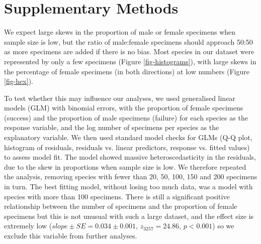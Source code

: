 \documentclass[a4paper, 12pt]{article}
\begin{document}

\newpage
\section*{Supplementary Methods}

We expect large skews in the proportion of male or female specimens when sample size is low, but the ratio of male:female specimens should approach 50:50 as more specimens are added if there is no bias. 
Most species in our dataset were represented by only a few specimens (Figure \ref{fig-histograms}), with large skews in the percentage of female specimens (in both directions) at low numbers (Figure \ref{fig-hex}).

To test whether this may influence our analyses, we used generalised linear models (GLM) with binomial errors, with the proportion of female specimens (success) and the proportion of male specimens (failure) for each species as the response variable, and the log number of specimens per species as the explanatory variable. 
We then used standard model checks for GLMs (Q-Q plot, histogram of residuals, residuals vs. linear predictors, response vs. fitted values) to assess model fit. 
The model showed massive heteroscedasticity in the residuals, due to the skew in proportions when sample size is low. 
We therefore repeated the analysis, removing species with fewer than 20, 50, 100, 150 and 200 specimens in turn. 
The best fitting model, without losing too much data, was a model with species with more than 100 specimens. 
There is still a significant positive relationship between the number of specimens and the proportion of female specimens but this is not unusual with such a large dataset, and the effect size is extremely low ($slope \pm SE = 0.034 \pm 0.001$, $z_3257 = 24.86$, $p < 0.001$) so we exclude this variable from further analyses.
\end{document}
